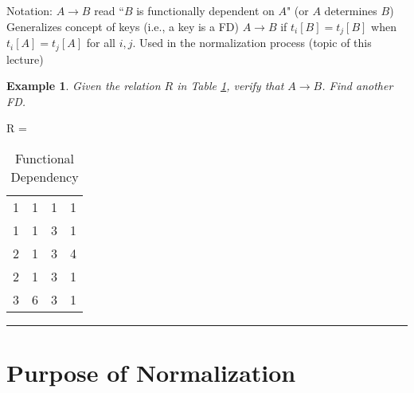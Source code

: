 \documentclass{article}
\newtheorem{example}{Example}
\begin{document}
\begin{outline}[]
    \1 Notation: $A \to B$ read ``$B$ is functionally dependent on $A$" (or $A$ determines $B$)
    \1 Generalizes concept of keys (i.e., a key is a FD)
    \1 $A \to B$ if $t_i[B] = t_j[B]$ when $t_i[A] = t_j[A]$ for all $i,j$.
    \1 Used in the normalization process (topic of this lecture)
\end{outline}





\begin{example}
        Given the relation $R$ in Table \ref{tab:xfd}, verify that $A \to B$.  Find another FD.  
\end{example}

\begin{table}[h!]
\caption{Functional Dependency}
\begin{center}

R = \begin{tabular}{|c|c|c|c|}
   \hline
  \cellcolor{excel}{A}  & \cellcolor{excel}{B}  &   \cellcolor{excel}{C}
&  \cellcolor{excel}{D}  \\
  \hline
  1 & 1 & 1  &   1 \\
      \hline
  1 & 1 & 3  &   1 \\
      \hline
  2 & 1 & 3  &   4 \\
      \hline
  2 & 1 & 3  &   1 \\
      \hline 
  3 & 6 & 3  &   1 \\
      \hline 
\end{tabular}
\end{center}
\label{tab:xfd}
\end{table}%
% 



\newpage

\hspace{-0.5cm}\rule[-0.101in]{\textwidth}{0.0025in}
  












\section*{Purpose of Normalization}
\end{document}
